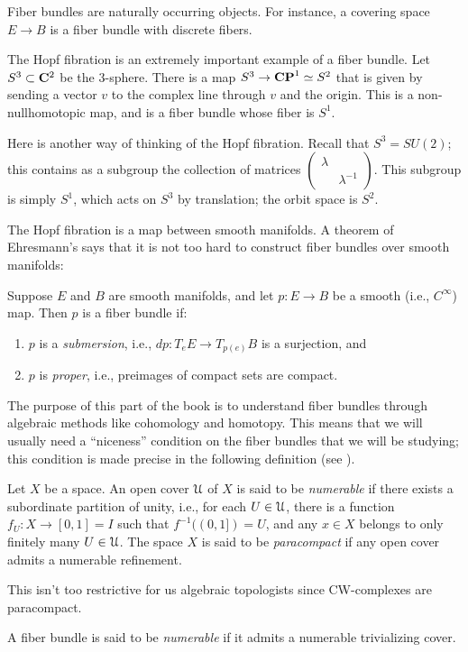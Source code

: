 Fiber bundles are naturally occurring objects.
For instance, a covering space $E\to B$ is a fiber bundle with discrete fibers. 
\begin{example}
    The Hopf fibration is an extremely important example of a fiber bundle.
    Let $S^3\subset \mathbf C^2$ be the $3$-sphere.
    There is a map $S^3\to \mathbf{CP}^1 \simeq S^2$ that is given by sending a vector $v$ to the
    complex line through $v$ and the origin.
    This is a non-nullhomotopic map, and is a fiber bundle whose fiber is $S^1$.
    
    Here is another way of thinking of the Hopf fibration.
    Recall that $S^3 = SU(2)$; this contains as a subgroup
    the collection of matrices $\begin{pmatrix}\lambda & \\ & \lambda^{-1}\end{pmatrix}$.
	This subgroup is simply $S^1$, which acts on $S^3$ by translation; 
	the orbit space is $S^2$.
\end{example}
The Hopf fibration is a map between smooth manifolds.
A theorem of Ehresmann's says that it is not too hard to construct fiber bundles over smooth manifolds:
\begin{theorem}[Ehresmann]
    Suppose $E$ and $B$ are smooth manifolds, and let $p:E\to B$ be a smooth (i.e., $C^\infty$) map.
    Then $p$ is a fiber bundle if:
    \begin{enumerate}
	\item $p$ is a \emph{submersion}, i.e., $dp:T_e E\to T_{p(e)} B$ is a surjection, and
	\item $p$ is \emph{proper}, i.e., preimages of compact sets are compact.
    \end{enumerate}
\end{theorem}
The purpose of this part of the book is to understand fiber bundles through algebraic methods like cohomology and homotopy.
This means that we will usually need a ``niceness'' condition on the fiber bundles that we will be studying;
this condition is made precise in the following definition (see \cite{MayConcise}).
\begin{definition}\label{numerable}
    Let $X$ be a space.
    An open cover $\mathcal U$ of $X$ is said to be \emph{numerable}
    if there exists a subordinate partition of unity, i.e.,
    for each $U\in\mathcal U$, there is a function $f_U:X\to [0,1]=I$
    such that $f^{-1}((0,1]) = U$,
    and any $x\in X$ belongs to only finitely many $U\in\mathcal U$.
    The space $X$ is said to be \emph{paracompact} if any open cover admits a numerable refinement.
\end{definition}
This isn't too restrictive for us algebraic topologists since CW-complexes are paracompact.
\begin{definition}
    A fiber bundle is said to be \emph{numerable} if it admits a numerable trivializing cover.
\end{definition}

